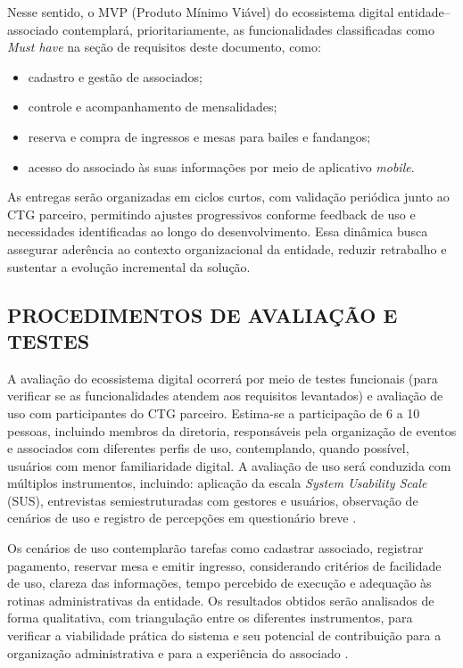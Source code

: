 ﻿\documentclass[12pt,a4paper]{article}
\begin{document}
Nesse sentido, o MVP (Produto Mínimo Viável) do ecossistema digital entidade--associado contemplará, prioritariamente, as funcionalidades classificadas como \textit{Must have} na seção de requisitos deste documento, como:

\begin{itemize}[leftmargin=*]
    \item cadastro e gestão de associados;
    \item controle e acompanhamento de mensalidades;
    \item reserva e compra de ingressos e mesas para bailes e fandangos;
    \item acesso do associado às suas informações por meio de aplicativo \textit{mobile}.
\end{itemize}

As entregas serão organizadas em ciclos curtos, com validação periódica junto ao CTG parceiro, permitindo ajustes progressivos conforme feedback de uso e necessidades identificadas ao longo do desenvolvimento. Essa dinâmica busca assegurar aderência ao contexto organizacional da entidade, reduzir retrabalho e sustentar a evolução incremental da solução.

\subsection{PROCEDIMENTOS DE AVALIAÇÃO E TESTES}

A avaliação do ecossistema digital ocorrerá por meio de testes funcionais (para verificar se as funcionalidades atendem aos requisitos levantados) e avaliação de uso com participantes do CTG parceiro. Estima-se a participação de 6 a 10 pessoas, incluindo membros da diretoria, responsáveis pela organização de eventos e associados com diferentes perfis de uso, contemplando, quando possível, usuários com menor familiaridade digital. A avaliação de uso será conduzida com múltiplos instrumentos, incluindo: aplicação da escala \textit{System Usability Scale} (SUS), entrevistas semiestruturadas com gestores e usuários, observação de cenários de uso e registro de percepções em questionário breve \citep{brooke1996,gil2017}.

Os cenários de uso contemplarão tarefas como cadastrar associado, registrar pagamento, reservar mesa e emitir ingresso, considerando critérios de facilidade de uso, clareza das informações, tempo percebido de execução e adequação às rotinas administrativas da entidade. Os resultados obtidos serão analisados de forma qualitativa, com triangulação entre os diferentes instrumentos, para verificar a viabilidade prática do sistema e seu potencial de contribuição para a organização administrativa e para a experiência do associado \citep{creswell2014,yin2015}.
\end{document}
